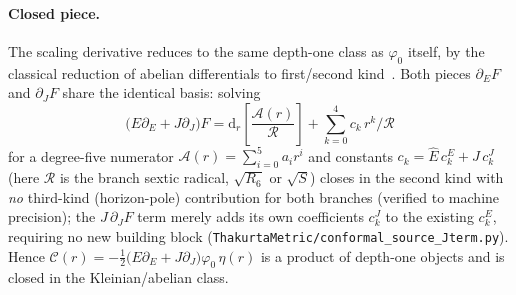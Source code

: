 \documentclass[12pt]{iopart}
\theoremstyle{plain}
\theoremstyle{definition}
\theoremstyle{remark}
\newcommand{\Ehat}{\hat E}
\newcommand{\dd}{\mathrm{d}}
\begin{document}
\paragraph{Closed piece.} The scaling derivative reduces to the same depth-one
class as $\varphi_0$ itself, by the classical reduction of abelian differentials to
first/second kind~\cite{BakerAbelian1897,GriffithsHarris1978}. Both pieces
$\partial_E F$ and $\partial_J F$ share the identical basis: solving
\begin{equation}
    \big(E\partial_E+J\partial_J\big)F=\dd_r\!\left[\frac{\mathcal{A}(r)}{\mathcal{R}}\right]
    +\sum_{k=0}^{4}c_k\,r^k/\mathcal{R}
    \label{eq:dEphi0}
\end{equation}
for a degree-five numerator $\mathcal{A}(r)=\sum_{i=0}^{5}a_i r^i$ and constants
$c_k=\Ehat\,c_k^{E}+J\,c_k^{J}$ (here $\mathcal{R}$ is the branch sextic radical,
$\sqrt{R_6}$ or $\sqrt{S}$) closes in the second kind with \emph{no} third-kind
(horizon-pole) contribution for both branches (verified to machine precision); the
$J\,\partial_J F$ term merely adds its own coefficients $c_k^{J}$ to the existing
$c_k^{E}$, requiring no new building block
(\texttt{ThakurtaMetric/conformal\_source\_Jterm.py}). Hence
$\mathcal{C}(r)=-\tfrac12\big(E\partial_E+J\partial_J\big)\varphi_0\,\eta(r)$ is
a product of depth-one objects and is closed in the Kleinian/abelian class.
\end{document}
